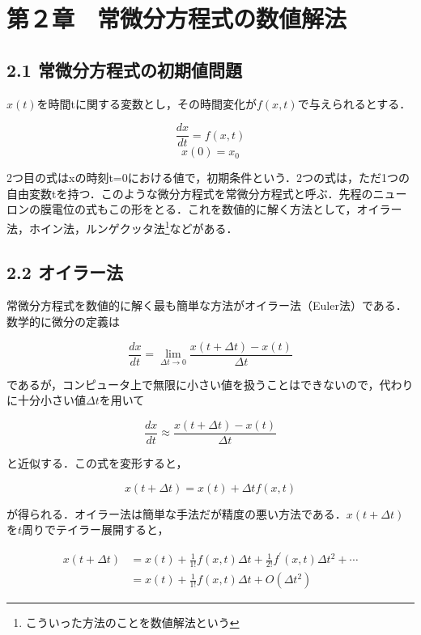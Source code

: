 \documentclass[dvipdfmx, A4j, twocolumn, 10.5pt]{jsarticle}
\begin{document}
\section*{第２章　常微分方程式の数値解法}

\subsection*{2.1 常微分方程式の初期値問題}
$x(t)$を時間tに関する変数とし，その時間変化が$f(x, t)$で与えられるとする．

\begin{equation}
  \frac{dx}{dt} = f(x, t)
\end{equation}
\begin{equation}
  x(0) = x_0
\end{equation}


2つ目の式はxの時刻t=0における値で，初期条件という．2つの式は，ただ1つの自由変数tを持つ．このような微分方程式を常微分方程式と呼ぶ．先程のニューロンの膜電位の式もこの形をとる．これを数値的に解く方法として，オイラー法，ホイン法，ルンゲクッタ法\footnote{こういった方法のことを数値解法という}などがある．

\subsection*{2.2 オイラー法}
常微分方程式を数値的に解く最も簡単な方法がオイラー法（Euler法）である．数学的に微分の定義は

\begin{equation}
  \frac{dx}{dt} = \lim_{\Delta t \to 0} \frac{x(t + \Delta t) - x(t)}{\Delta t}
\end{equation}

であるが，コンピュータ上で無限に小さい値を扱うことはできないので，代わりに十分小さい値$\Delta t$を用いて

\begin{equation}
  \frac{dx}{dt} \approx \frac{x(t + \Delta t) - x(t)}{\Delta t}
\end{equation}


と近似する．この式を変形すると，

\begin{equation}
 x(t+\Delta t)=x(t)+\Delta t f(x, t)
\end{equation}


が得られる．オイラー法は簡単な手法だが精度の悪い方法である．$x(t+\Delta t)$を$t$周りでテイラー展開すると，

$$
\begin{aligned}
x(t+\Delta t) & =x(t)+\frac{1}{1!} f(x, t) \Delta t+\frac{1}{2!} f^{\prime}(x, t) \Delta t^2+\cdots \\
& =x(t)+\frac{1}{1!} f(x, t) \Delta t+O\left(\Delta t^2\right)
\end{aligned}
$$
\end{document}
